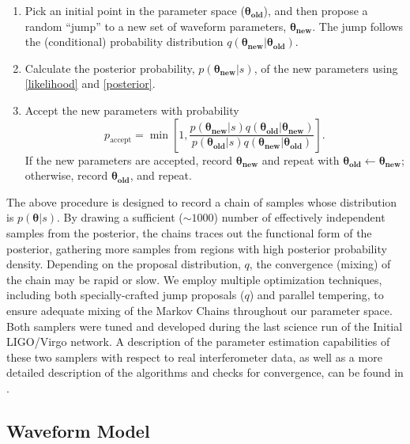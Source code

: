 \documentclass[11pt,a4paper]{emulateapj}
\newcommand{\thpara}{\boldsymbol{\theta}}
\begin{document}
\begin{enumerate}
\item Pick an initial point in the parameter space
  ($\boldsymbol{\theta_{\text{old}}}$), and then propose a random
  ``jump'' to a new set of waveform parameters,
  $\boldsymbol{\theta_{\text{new}}}$.  The jump follows the
  (conditional) probability distribution $q\left(
  \boldsymbol{\theta_{\text{new}}} | \boldsymbol{\theta_{\text{old}}}
  \right)$.
\item Calculate the posterior probability,
  $p(\boldsymbol{\theta_{\text{new}}}|s)$, of the new parameters using
  \eqref{likelihood} and \eqref{posterior}.
\item Accept the new parameters with probability 
  \begin{equation}
    p_\mathrm{accept} = \min \left[ 1, \frac{p(\boldsymbol{\theta_{\text{new}}}|s) q\left(\boldsymbol{\theta_{\text{old}}} | \boldsymbol{\theta_{\text{new}}} \right)}{p(\boldsymbol{\theta_{\text{old}}}|s) q\left(\boldsymbol{\theta_{\text{new}}} | \boldsymbol{\theta_{\text{old}}} \right)} \right].
  \end{equation}
  If the new parameters are accepted, record
  $\boldsymbol{\theta_\text{new}}$ and repeat with
  $\boldsymbol{\theta_\text{old}} \gets
  \boldsymbol{\theta_\text{new}}$; otherwise, record
  $\boldsymbol{\theta_\text{old}}$, and repeat.
\end{enumerate} 
  
The above procedure is designed to record a chain of samples whose
distribution is $p\left(\thpara|s\right)$.  By drawing a sufficient ($\sim1000$) number
 of effectively independent samples from the posterior, the chains traces out the functional form of the posterior,
 gathering more samples from regions with high posterior probability density.  Depending on
the proposal distribution, $q$, the convergence (mixing) of the chain
may be rapid or slow.  We employ multiple optimization techniques,
including both specially-crafted jump proposals ($q$) and parallel tempering, to ensure
adequate mixing of the Markov Chains throughout our parameter space.
Both samplers were tuned and 
developed during the last science run of the Initial LIGO/Virgo network.  
A description of the parameter estimation capabilities of these two samplers with respect to
real interferometer data, as well as a more detailed description of the algorithms and
checks for convergence, can be found in \cite{S6PE}.
  
 
\subsection{Waveform Model}
\label{waveformSection}
  
\end{document}
